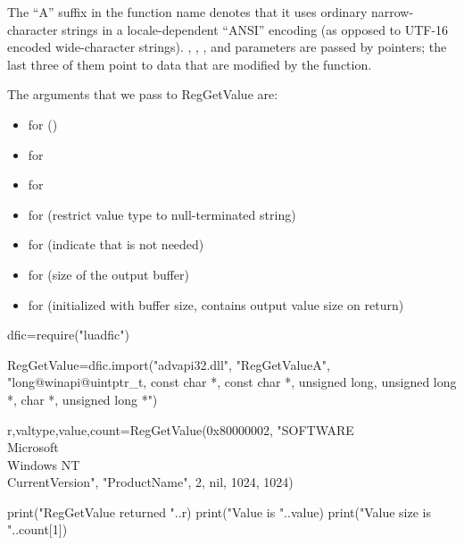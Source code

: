 \documentclass[a4paper,12pt,twoside,extrafontsizes]{memoir}
\begin{document}
The ``A'' suffix in the function name denotes that it uses ordinary narrow-character strings in a locale-dependent ``ANSI'' encoding (as opposed to UTF-16 encoded wide-character strings). , , ,  and  parameters are passed by pointers; the last three of them point to data that are modified by the function.

The arguments that we pass to RegGetValue are:

\begin{itemize}\raggedright
	\item{} for  ()
	\item{} for 
	\item{} for 
	\item{} for  (restrict value type to null-terminated string)
	\item{} for  (indicate that  is not needed)
	\item{} for  (size of the output buffer)
	\item{} for  (initialized with buffer size, contains output value size on return)
\end{itemize}

\begin{breakshellcmds}\begin{luacode}
dfic=require("luadfic")

RegGetValue=dfic.import("advapi32.dll", "RegGetValueA", "long@winapi@uintptr_t, const char *, const char *, unsigned long, unsigned long *, char *, unsigned long *")

r,valtype,value,count=RegGetValue(0x80000002, "SOFTWARE\\Microsoft\\Windows NT\\CurrentVersion", "ProductName", 2, nil, 1024, {1024})

print("RegGetValue returned "..r)
print("Value is "..value)
print("Value size is "..count[1])
\end{luacode}\end{breakshellcmds}
\end{document}
